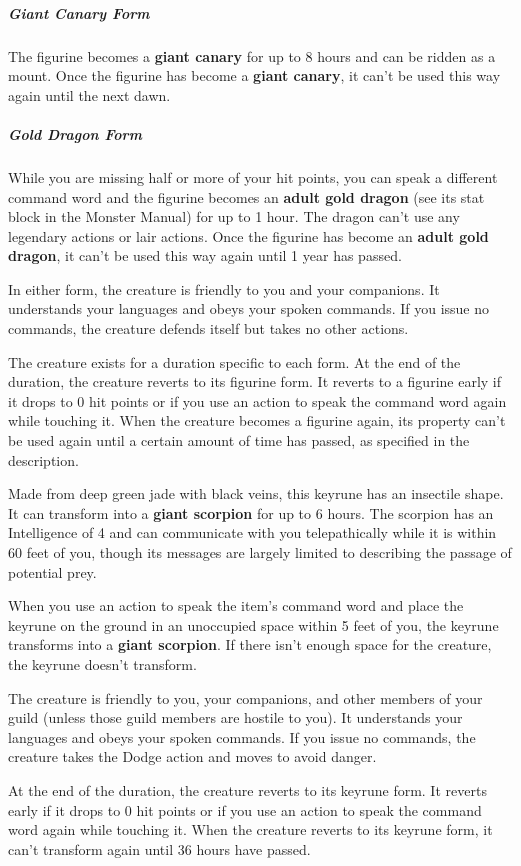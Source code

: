 \documentclass[10pt,a4paper,twoside,bg=print,twocolumn,openany,nodeprecatedcode]{dndbook}
\begin{document}
\subparagraph{Giant Canary Form}
The figurine becomes a \textbf{giant canary} for up to 8 hours and can be ridden as a mount. Once the figurine has become a \textbf{giant canary}, it can't be used this way again until the next dawn.

\subparagraph{Gold Dragon Form}
While you are missing half or more of your hit points, you can speak a different command word and the figurine becomes an \textbf{adult gold dragon} (see its stat block in the Monster Manual) for up to 1 hour. The dragon can't use any legendary actions or lair actions. Once the figurine has become an \textbf{adult gold dragon}, it can't be used this way again until 1 year has passed.

In either form, the creature is friendly to you and your companions. It understands your languages and obeys your spoken commands. If you issue no commands, the creature defends itself but takes no other actions.

The creature exists for a duration specific to each form. At the end of the duration, the creature reverts to its figurine form. It reverts to a figurine early if it drops to 0 hit points or if you use an action to speak the command word again while touching it. When the creature becomes a figurine again, its property can't be used again until a certain amount of time has passed, as specified in the description.

Made from deep green jade with black veins, this keyrune has an insectile shape. It can transform into a \textbf{giant scorpion} for up to 6 hours. The scorpion has an Intelligence of 4 and can communicate with you telepathically while it is within 60 feet of you, though its messages are largely limited to describing the passage of potential prey.

When you use an action to speak the item's command word and place the keyrune on the ground in an unoccupied space within 5 feet of you, the keyrune transforms into a \textbf{giant scorpion}. If there isn't enough space for the creature, the keyrune doesn't transform.

The creature is friendly to you, your companions, and other members of your guild (unless those guild members are hostile to you). It understands your languages and obeys your spoken commands. If you issue no commands, the creature takes the Dodge action and moves to avoid danger.

At the end of the duration, the creature reverts to its keyrune form. It reverts early if it drops to 0 hit points or if you use an action to speak the command word again while touching it. When the creature reverts to its keyrune form, it can't transform again until 36 hours have passed.
\end{document}
